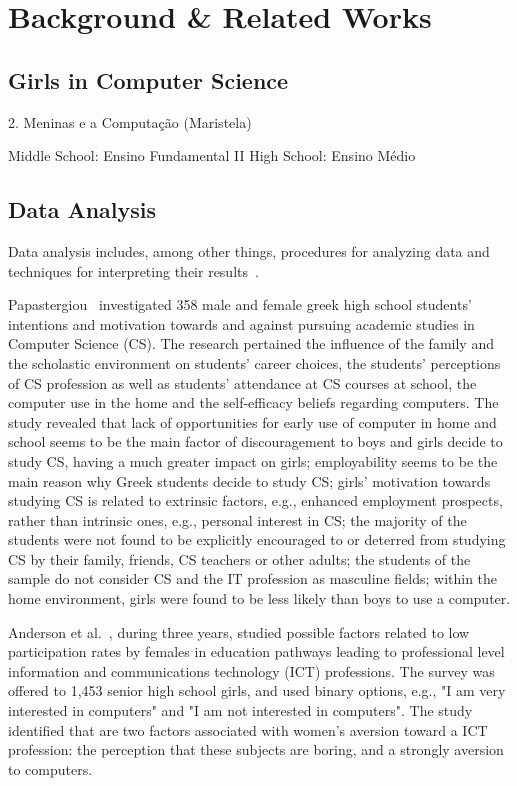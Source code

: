 \section{Background \& Related Works}\label{sec:background}%

\subsection{Girls in Computer Science}\label{subsec:background:girls}%
2. Meninas e a Computação (Maristela)

Middle School: Ensino Fundamental II
High School: Ensino Médio

\subsection{Data Analysis}\label{subsec:background:data}%

Data analysis includes, among other things, procedures for analyzing data and techniques for interpreting their results~\cite{Tukey1962}.

%


%

Papastergiou~\cite{papastergiou_are_2008} investigated 358 male and female greek high school students' intentions and motivation towards and against pursuing academic studies in Computer Science (CS). The research pertained the influence of the family and the scholastic environment on students' career choices, the students' perceptions of CS profession as well as students' attendance at CS courses at school, the computer use in the home and the self-efficacy beliefs regarding computers. The study revealed that lack of opportunities for early use of computer in home and school seems to be the main factor of discouragement to boys and girls decide to study CS, having a much greater impact on girls; employability seems to be the main reason why Greek students decide to study CS; girls' motivation towards studying CS is related to extrinsic factors, e.g., enhanced employment prospects, rather than intrinsic ones, e.g., personal interest in CS; the majority of the students were not found to be explicitly encouraged to or deterred from studying CS by their family, friends, CS teachers or other adults; the students of the sample do not consider CS and the IT profession as masculine fields; within the home environment, girls were found to be less likely than boys to use a computer.

Anderson et al.~\cite{anderson_because_2008}, during three years, studied possible factors related to  low participation rates by females in education pathways leading to professional level information and communications technology (ICT) professions. The survey was offered to 1,453 senior high school girls, and used binary options, e.g., "I am very interested in computers" and "I am not interested in computers". The study identified that are two factors associated with women's aversion toward a ICT profession: the perception that these subjects are boring, and a strongly aversion to computers. 